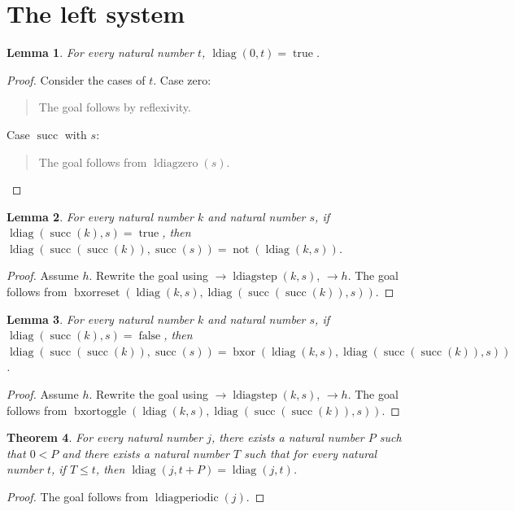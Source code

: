 \documentclass[11pt]{article}
\newtheorem{theorem}{Theorem}[section]
\newtheorem{lemma}[theorem]{Lemma}
\theoremstyle{definition}
\begin{document}
\section{The left system}
\label{ll:paper:left-system}
\begin{lemma}
\label{ll:paper:edge-black}
For every natural number \(t\), \(\operatorname{ldiag}(0, t) = \operatorname{true}\).
\end{lemma}
\begin{proof}
Consider the cases of \(t\).
Case zero:
\begin{quote}
The goal follows by reflexivity.
\end{quote}
Case \(\operatorname{succ}\) with \(s\):
\begin{quote}
The goal follows from \(\operatorname{ldiagzero}(s)\).
\end{quote}
\end{proof}
\begin{lemma}
\label{ll:paper:diag-reset}
For every natural number \(k\) and natural number \(s\), if \(\operatorname{ldiag}(\operatorname{succ}(k), s) = \operatorname{true}\), then \(\operatorname{ldiag}(\operatorname{succ}(\operatorname{succ}(k)), \operatorname{succ}(s)) = \operatorname{not}(\operatorname{ldiag}(k, s))\).
\end{lemma}
\begin{proof}
Assume \(h\).
Rewrite the goal using \(\rightarrow \operatorname{ldiagstep}(k, s)\), \(\rightarrow h\).
The goal follows from \(\operatorname{bxorreset}(\operatorname{ldiag}(k, s), \operatorname{ldiag}(\operatorname{succ}(\operatorname{succ}(k)), s))\).
\end{proof}
\begin{lemma}
\label{ll:paper:diag-toggle}
For every natural number \(k\) and natural number \(s\), if \(\operatorname{ldiag}(\operatorname{succ}(k), s) = \operatorname{false}\), then \(\operatorname{ldiag}(\operatorname{succ}(\operatorname{succ}(k)), \operatorname{succ}(s)) = \operatorname{bxor}(\operatorname{ldiag}(k, s), \operatorname{ldiag}(\operatorname{succ}(\operatorname{succ}(k)), s))\).
\end{lemma}
\begin{proof}
Assume \(h\).
Rewrite the goal using \(\rightarrow \operatorname{ldiagstep}(k, s)\), \(\rightarrow h\).
The goal follows from \(\operatorname{bxortoggle}(\operatorname{ldiag}(k, s), \operatorname{ldiag}(\operatorname{succ}(\operatorname{succ}(k)), s))\).
\end{proof}
\begin{theorem}
\label{ll:paper:leading-digits}
For every natural number \(j\), there exists a natural number \(P\) such that \(0 < P\) and there exists a natural number \(T\) such that for every natural number \(t\), if \(T \le t\), then \(\operatorname{ldiag}(j, t + P) = \operatorname{ldiag}(j, t)\).
\end{theorem}
\begin{proof}
The goal follows from \(\operatorname{ldiagperiodic}(j)\).
\end{proof}
\end{document}
